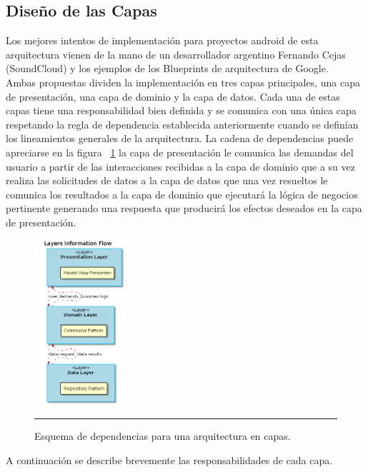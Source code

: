 \subsection{Diseño de las Capas}

Los mejores intentos de implementación para proyectos android de esta arquitectura vienen de la mano de un desarrollador argentino Fernando Cejas \cite{clean_cejas} (SoundCloud) y los ejemplos de los Blueprints de arquitectura de  Google\cite{clean_android_blueprints}.\\
Ambas propuestas dividen la implementación en tres capas principales, una capa de presentación, una capa de dominio y la capa de datos.
Cada una de estas capas tiene una responsabilidad bien definida y se comunica con una única capa respetando la regla de dependencia establecida anteriormente cuando se definían los lineamientos generales de la arquitectura.
La cadena de dependencias puede apreciarse en la figura ~\ref{fig:Diagrama_clasico2} la capa de presentación le comunica las demandas del usuario a partir de las interacciones recibidas a la capa de dominio que a su vez realiza las solicitudes de datos a la capa de datos que una vez resueltos le comunica los resultados a la capa de dominio que ejecutará la lógica de negocios pertinente generando una respuesta que producirá los efectos deseados en la capa de presentación.\\
\begin{figure}[htbp]
	\centering
	\includegraphics[width=0.3\textwidth]{Figures/-006.png}
	\rule{35em}{1pt}
	\caption[Dependencia de Módulos]{Esquema de dependencias para una arquitectura en capas.}
	\label{fig:Diagrama_clasico2}
\end{figure}
A continuación se describe brevemente las responsabilidades de cada capa.




